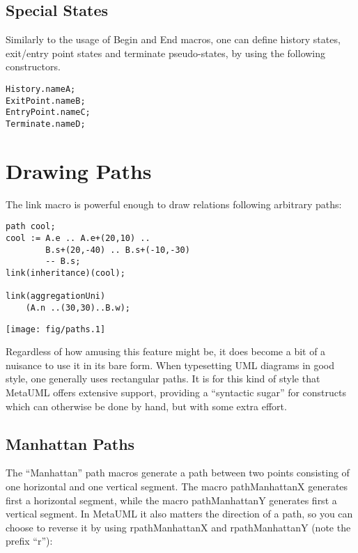 \documentclass{article}
\newcommand{\code}{\ttfamily}
\begin{document}
\subsection{Special States}

Similarly to the usage of {\code Begin} and {\code End} macros, one can define history states,
exit/entry point states and terminate pseudo-states, by using the following constructors.

\begin{verbatim}
History.nameA;
ExitPoint.nameB;
EntryPoint.nameC;
Terminate.nameD;
\end{verbatim}

\section{Drawing Paths}

The {\code link} macro is powerful enough to draw relations following arbitrary paths:

\begin{multicols}{2}
\begin{verbatim}
path cool;
cool := A.e .. A.e+(20,10) ..
        B.s+(20,-40) .. B.s+(-10,-30)
        -- B.s;
link(inheritance)(cool);

link(aggregationUni)
    (A.n ..(30,30)..B.w);
\end{verbatim}
\columnbreak
\hspace{1cm}\texttt{[image: fig/paths.1]}
\end{multicols}

Regardless of how amusing this feature might be, it does become a bit of a nuisance to
use it in its bare form. When typesetting UML diagrams in good style, one generally
uses rectangular paths. It is for this kind of style that MetaUML offers extensive
support, providing a ``syntactic sugar'' for constructs which can otherwise be
done by hand, but with some extra effort.

\subsection{Manhattan Paths}

The ``Manhattan'' path macros generate a path between two points consisting of one
horizontal and one vertical segment. The macro {\code pathManhattanX} generates first a
horizontal segment, while the macro {\code pathManhattanY} generates first a
vertical segment. In MetaUML it also matters the direction of a path, so you
can choose to reverse it by using {\code rpathManhattanX} and {\code rpathManhattanY}
(note the prefix ``{\code r}''):
\end{document}
